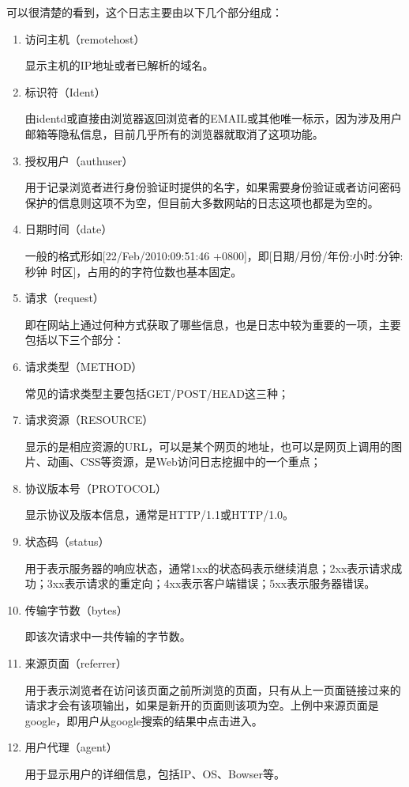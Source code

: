 可以很清楚的看到，这个日志主要由以下几个部分组成：

\begin{enumerate}
\item 访问主机（remotehost）

显示主机的IP地址或者已解析的域名。

\item 标识符（Ident）

由identd或直接由浏览器返回浏览者的EMAIL或其他唯一标示，因为涉及用户邮箱等隐私信息，目前几乎所有的浏览器就取消了这项功能。

\item 授权用户（authuser）

用于记录浏览者进行身份验证时提供的名字，如果需要身份验证或者访问密码保护的信息则这项不为空，但目前大多数网站的日志这项也都是为空的。

\item 日期时间（date）

一般的格式形如[22/Feb/2010:09:51:46 +0800]，即[日期/月份/年份:小时:分钟:秒钟 时区]，占用的的字符位数也基本固定。

\item 请求（request）

即在网站上通过何种方式获取了哪些信息，也是日志中较为重要的一项，主要包括以下三个部分：


\item 请求类型（METHOD）

常见的请求类型主要包括GET/POST/HEAD这三种；


\item 请求资源（RESOURCE）


显示的是相应资源的URL，可以是某个网页的地址，也可以是网页上调用的图片、动画、CSS等资源，是Web访问日志挖掘中的一个重点；


\item 协议版本号（PROTOCOL）


显示协议及版本信息，通常是HTTP/1.1或HTTP/1.0。

\item 状态码（status）

用于表示服务器的响应状态，通常1xx的状态码表示继续消息；2xx表示请求成功；3xx表示请求的重定向；4xx表示客户端错误；5xx表示服务器错误。

\item 传输字节数（bytes）

即该次请求中一共传输的字节数。

\item 来源页面（referrer）

用于表示浏览者在访问该页面之前所浏览的页面，只有从上一页面链接过来的请求才会有该项输出，如果是新开的页面则该项为空。上例中来源页面是google，即用户从google搜索的结果中点击进入。

\item 用户代理（agent）

用于显示用户的详细信息，包括IP、OS、Bowser等。

\end{enumerate}

